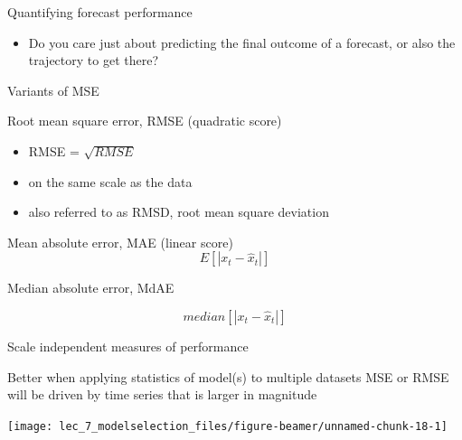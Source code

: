 \documentclass[ignorenonframetext,]{beamer}
\providecommand{\tightlist}{%
  \setlength{\itemsep}{0pt}\setlength{\parskip}{0pt}}
\begin{document}
\begin{frame}[fragile]
\begin{block}{Quantifying forecast performance}
\begin{itemize}
\tightlist
\item
  Do you care just about predicting the final outcome of a forecast, or
  also the trajectory to get there?
\end{itemize}

\end{block}

\begin{block}{Variants of MSE}

Root mean square error, RMSE (quadratic score)

\begin{itemize}
\tightlist
\item
  RMSE = \(\sqrt { RMSE }\)
\item
  on the same scale as the data
\item
  also referred to as RMSD, root mean square deviation
\end{itemize}

Mean absolute error, MAE (linear score)
\[E\left[ \left| { x }_{ t }-{ \hat { x }  }_{ t }  \right|  \right]\]

Median absolute error, MdAE

\[median\left[ \left| { x }_{ t }-{ \hat { x }  }_{ t } \right|  \right]\]

\end{block}

\begin{block}{Scale independent measures of performance}

Better when applying statistics of model(s) to multiple datasets MSE or
RMSE will be driven by time series that is larger in magnitude

\begin{center}\texttt{[image: lec\_7\_modelselection\_files/figure-beamer/unnamed-chunk-18-1]} \end{center}

\end{block}

\begin{block}{}


\end{block}
\end{frame}
\end{document}
